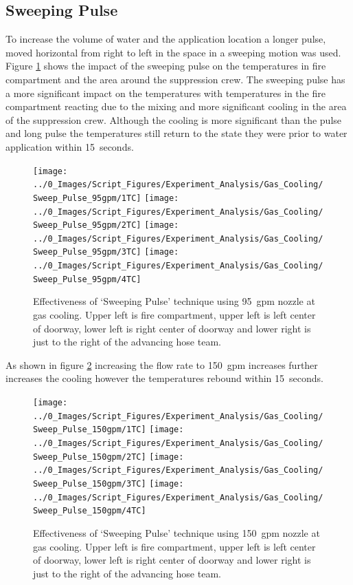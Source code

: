 \documentclass[12pt,oneside]{book}
\begin{document}
\subsection {Sweeping Pulse}
To increase the volume of water and the application location a longer pulse, moved horizontal from right to left in the space in a sweeping motion was used. Figure \ref{fig:gas_sweep_pulse_95} shows the impact of the sweeping pulse on the temperatures in fire compartment and the area around the suppression crew. The sweeping pulse has a more significant impact on the temperatures with temperatures in the fire compartment reacting due to the mixing and more significant cooling in the area of the suppression crew. Although the cooling is more significant than the pulse and long pulse the temperatures still return to the state they were prior to water application within 15~seconds.

\begin{figure}[H]
\centering
\texttt{[image: ../0\_Images/Script\_Figures/Experiment\_Analysis/Gas\_Cooling/Sweep\_Pulse\_95gpm/1TC]}
\texttt{[image: ../0\_Images/Script\_Figures/Experiment\_Analysis/Gas\_Cooling/Sweep\_Pulse\_95gpm/2TC]}
\texttt{[image: ../0\_Images/Script\_Figures/Experiment\_Analysis/Gas\_Cooling/Sweep\_Pulse\_95gpm/3TC]}
\texttt{[image: ../0\_Images/Script\_Figures/Experiment\_Analysis/Gas\_Cooling/Sweep\_Pulse\_95gpm/4TC]}
\caption[Gas Cooling - Sweeping Pulse 95~gpm]{Effectiveness of `Sweeping Pulse' technique using 95~gpm nozzle at gas cooling. Upper left is fire compartment, upper left is left center of doorway, lower left is right center of doorway and lower right is just to the right of the advancing hose team.}
\label{fig:gas_sweep_pulse_95}
\end{figure}

As shown in figure \ref{fig:gas_sweep_pulse_150} increasing the flow rate to 150~gpm increases further increases the cooling however the temperatures rebound within 15~seconds. 

\begin{figure}[H]
\centering
\texttt{[image: ../0\_Images/Script\_Figures/Experiment\_Analysis/Gas\_Cooling/Sweep\_Pulse\_150gpm/1TC]}
\texttt{[image: ../0\_Images/Script\_Figures/Experiment\_Analysis/Gas\_Cooling/Sweep\_Pulse\_150gpm/2TC]}
\texttt{[image: ../0\_Images/Script\_Figures/Experiment\_Analysis/Gas\_Cooling/Sweep\_Pulse\_150gpm/3TC]}
\texttt{[image: ../0\_Images/Script\_Figures/Experiment\_Analysis/Gas\_Cooling/Sweep\_Pulse\_150gpm/4TC]}
\caption[Gas Cooling - Sweeping Pulse 150~gpm]{Effectiveness of `Sweeping Pulse' technique using 150~gpm nozzle at gas cooling. Upper left is fire compartment, upper left is left center of doorway, lower left is right center of doorway and lower right is just to the right of the advancing hose team.}
\label{fig:gas_sweep_pulse_150}
\end{figure}
\end{document}
